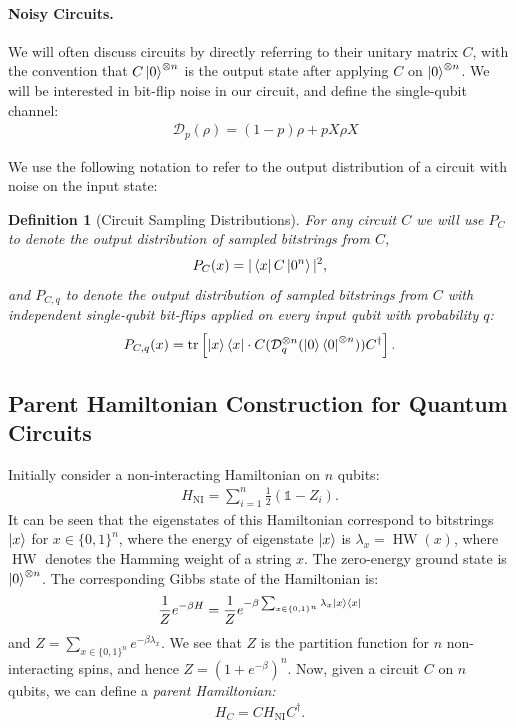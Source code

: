 \documentclass[a4paper,onecolumn,11pt,accepted=2017-05-09]{quantumarticle}
\newcommand{\HNI}{H_{\text{NI}}}
\newcommand{\ox}{\otimes}
\newcommand{\cD}{\mathcal{D}}
\DeclareMathOperator{\HW}{HW}
\DeclareMathOperator{\tr}{tr}
\newtheorem{definition}[theorem]{Definition}
\begin{document}
    \paragraph{Noisy Circuits.} We will often discuss circuits by directly referring to their unitary matrix $C$, with the convention that $C\ket{0}^{\otimes n}$ is the output state after applying $C$ on $\ket{0}^{\otimes n}$. We will be interested in bit-flip noise in our circuit, and define the single-qubit channel:
    \begin{align*}
        &\cD_p(\rho) = (1-p)\rho + pX\rho X
    \end{align*}
    
	\noindent We use the following notation to refer to the output distribution of a circuit with noise on the input state:
	\begin{definition}[Circuit Sampling Distributions]
		For any circuit $C$ we will use $P_C$ to denote the output distribution of sampled bitstrings from $C$,
		\begin{align*}
			P_C(x) = |\bra{x}C\ket{0^n}|^2,
		\end{align*}
		and $P_{C,q}$ to denote the output distribution of sampled bitstrings from $C$ with independent single-qubit bit-flips applied on every input qubit with probability $q$:
  \begin{align*}
      P_{C,q}(x) = \tr\left[  \ket{x}\bra{x}\cdot C (\cD^{\ox n}_q( \ket{0}\bra{0}^{\ox n}))  C^\dagger \right].
  \end{align*}
	\end{definition}

 \subsection{Parent Hamiltonian Construction for Quantum Circuits}

	Initially consider a non-interacting Hamiltonian on $n$ qubits:
	\begin{align*}
		\HNI = \sum_{i=1}^n \frac{1}{2} (\mathds{1}-Z_i).
	\end{align*}
	It can be seen that the eigenstates of this Hamiltonian correspond to bitstrings $\ket{x}$ for $x\in \{0,1\}^n$, where the energy of eigenstate $\ket{x}$ is $\lambda_x = \HW(x)$, where $\HW$ denotes the Hamming weight of a string $x$.
	The zero-energy ground state is $\ket{0}^{\ox n}$.
	The corresponding Gibbs state of the Hamiltonian is:
	\begin{align*}
		\frac{1}{Z}e^{-\beta H} = \frac{1}{Z}e^{-\beta \sum_{x\in \{0,1\}^n} \lambda_x \ket{x}\bra{x}}
	\end{align*}
	and $Z= \sum_{x\in \{0,1\}^n} e^{-\beta \lambda_x}$. 
	We see that $Z$ is the partition function for $n$ non-interacting spins, and hence $Z= (1+e^{-\beta})^n$. 
	Now, given a circuit $C$ on $n$ qubits, we can define a \textit{parent Hamiltonian:}
	\begin{align*}
		H_C = C\HNI C^\dagger.
	\end{align*}
\end{document}

